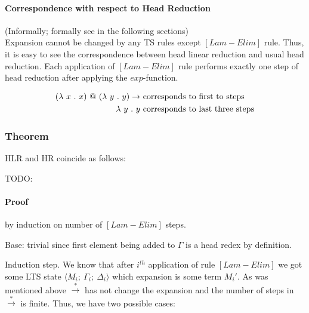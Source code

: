 \documentclass[a4paper, 10pt]{article}
\begin{document}
\paragraph{Correspondence with respect to Head Reduction} (Informally; formally see in the following sections) \\
Expansion cannot be changed by any TS rules except $[Lam-Elim]$ rule. Thus, 
it is easy to see the correspondence between head linear reduction and usual head
reduction. Each application of $[Lam-Elim]$ rule performs exactly one step of head
reduction after applying the $exp$-function.

\begin{align*}
  (\lambda \ x\ .\ x)\ @\ (\lambda \ y\ .\  y) \rightarrow &\ \textnormal{corresponds to first to steps} \\
  \lambda \ y\ .\ y  &\ \textnormal{corresponds to last three steps}
\end{align*}

\subsubsection{Theorem} HLR and HR coincide as follows:

TODO:


\paragraph{Proof} by induction on number of $[Lam-Elim]$ steps.

Base: trivial since first element being added to $\Gamma$ is a head redex by definition.

Induction step. We know that after $i^{th}$ application of rule $[Lam-Elim]$ we got some LTS state $\langle M_i;\ \Gamma_i;\ \Delta_i \rangle$ which expansion is some term $M_i'$. As was mentioned above $\overset{*}{\rightarrow}$ has not change the expansion and the number of steps in $\overset{*}{\rightarrow}$ is finite. Thus, we have two possible cases:
\end{document}
